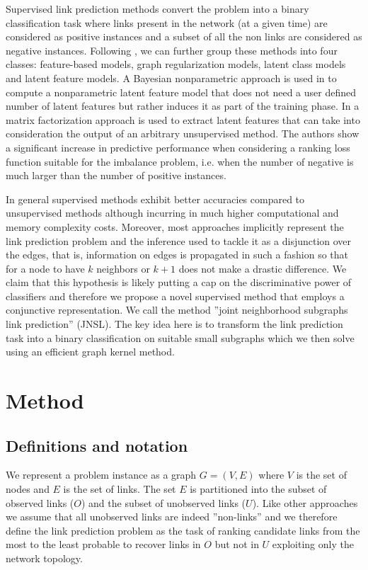 \documentclass[runningheads,a4paper]{llncs}
\begin{document}
Supervised link prediction methods convert the problem into a binary classification task where links present in the network (at a given time) are considered as positive instances and a subset of all the non links are considered as negative instances. Following \cite{matrix-factorization}, we can further group these methods into four classes: feature-based models, graph regularization models, latent class models and latent feature models. 
A Bayesian nonparametric approach is used in \cite{nonparametric} to compute a nonparametric latent feature model that does not need a user defined number of latent features but rather induces it as part of the training phase. 
In \cite{matrix-factorization} a matrix factorization approach is used to extract latent features that can take into consideration the output of an arbitrary unsupervised method. The authors show a significant increase in predictive performance when considering a ranking loss function suitable for  the imbalance problem, i.e. when the number of negative is much larger than the number of positive instances. 

In general supervised methods exhibit better accuracies compared to unsupervised methods although incurring in much higher computational and memory complexity costs.
Moreover, most approaches implicitly represent the link prediction problem and the inference used to tackle it as a disjunction over the edges, that is, information on edges is propagated in such a fashion so that for a node to have $k$ neighbors or $k+1$ does not make a drastic difference.
We claim that this hypothesis is likely putting a cap on the discriminative power of classifiers and therefore we propose a novel supervised method that employs a conjunctive representation. We call the method ''joint neighborhood subgraphs link prediction'' (JNSL). The key idea here is to transform the link prediction task into a binary classification on suitable small subgraphs which we then solve using an efficient graph kernel method.


\section{Method}

\subsection{Definitions and notation}
We represent a problem instance as a graph $G=(V,E)$ where $V$ is the set of nodes and $E$ is the set of links. The set $E$ is partitioned into the subset of observed links ($O$) and the subset of unobserved links ($U$). Like other approaches we assume that all unobserved links are indeed ''non-links'' and we therefore define the link prediction problem as the task of ranking candidate links from the most to the least probable to recover links in $O$ but not in $U$ exploiting only the network topology.
\end{document}
